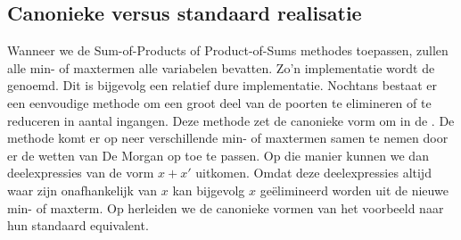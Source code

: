 \subsection{Canonieke versus standaard realisatie}
Wanneer we de Sum-of-Products of Product-of-Sums methodes toepassen, zullen alle min- of maxtermen alle variabelen bevatten. Zo'n implementatie wordt de  genoemd. Dit is bijgevolg een relatief dure implementatie. Nochtans bestaat er een eenvoudige methode om een groot deel van de poorten te elimineren of te reduceren in aantal ingangen. Deze methode zet de canonieke vorm om in de . De methode komt er op neer verschillende min- of maxtermen samen te nemen door er de wetten van De Morgan op toe te passen. Op die manier kunnen we dan deelexpressies van de vorm $x+x'$ uitkomen. Omdat deze deelexpressies altijd waar zijn onafhankelijk van $x$ kan bijgevolg $x$ geëlimineerd worden uit de nieuwe min- of maxterm. Op  herleiden we de canonieke vormen van het voorbeeld naar hun standaard equivalent.
